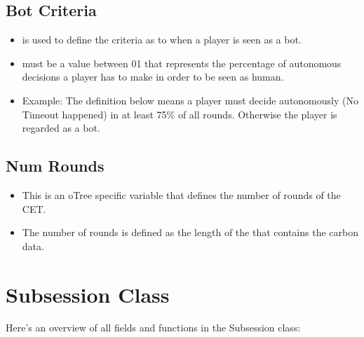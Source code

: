 \documentclass[letterpaper,10pt,english]{sphinxmanual}
\begin{document}
\subsection{Bot Criteria}
\label{\detokenize{Constants:bot-criteria}}\label{\detokenize{Constants:bot-criteria-ref}}\begin{itemize}
\item {} 
 is used to define the criteria as to when a player is seen as a bot.

\item {} 
 must be a value between 0\sphinxhyphen{}1 that represents the percentage of autonomous decisions a player has to make in order to be seen as human.

\item {} 
Example: The definition below means a player must decide autonomously (No Timeout happened) in at least 75\% of all rounds. Otherwise the player is regarded as a bot.

\end{itemize}

\begin{sphinxVerbatim}[commandchars=\\\{\}]
  
\end{sphinxVerbatim}


\subsection{Num Rounds}
\label{\detokenize{Constants:num-rounds}}\begin{itemize}
\item {} 
This is an oTree specific variable that defines the number of rounds of the CET.

\item {} 
The number of rounds is defined as the length of the {\hyperref[\detokenize{cet_data_csv:csv-file}]{}} that contains the carbon data.

\end{itemize}




\section{Subsession Class}
\label{\detokenize{Subsession_fields:subsession-class}}\label{\detokenize{Subsession_fields:subsession-fields}}\label{\detokenize{Subsession_fields::doc}}
Here’s an overview of all fields and functions in the Subsession class:
\end{document}

